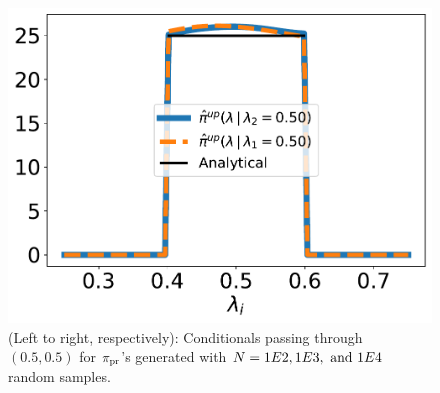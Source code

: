 \begin{figure}[ht]
\begin{minipage}{.315\textwidth}
		\includegraphics[width=\linewidth]{./examples/identity/samp/identity_1d_conditionals_50E-2_N10000_approx.pdf}
	\end{minipage}
\caption{
(Left to right, respectively): Conditionals passing through $(0.5, 0.5)$ for $\operatorname*{\pi_{pr}}$'s generated with $N=1E2, 1E3, \text{ and } 1E4$ random samples.
}
\label{fig:identity_sampling_conditionals}
\end{figure}
\FloatBarrier
